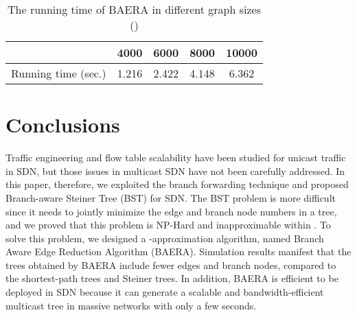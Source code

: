 \documentclass[conference]{IEEEtran}
\begin{document}
\begin{table}[t]
\caption{The running time of BAERA in different graph sizes ()}\centering
\label{table:time_v}
\begin{tabular}{|c|c|c|c|c|}
\hline
 & 4000 & 6000 & 8000 & 10000 \\ \hline
Running time (sec.) & 1.216 & 2.422 & 4.148 & 6.362 \\ \hline
\end{tabular}\end{table}

\section{Conclusions}
Traffic engineering and flow table scalability have been studied for unicast
traffic in SDN, but those issues in multicast SDN have not been carefully
addressed. In this paper, therefore, we exploited the branch forwarding
technique and proposed Branch-aware Steiner Tree (BST) for SDN. The BST
problem is more difficult since it needs to jointly minimize the edge and
branch node numbers in a tree, and we proved that this problem is NP-Hard
and inapproximable within . To solve this problem, we designed a -approximation algorithm, named Branch Aware Edge Reduction Algorithm
(BAERA). Simulation results manifest that the trees obtained by BAERA
include fewer edges and branch nodes, compared to the shortest-path trees
and Steiner trees. In addition, BAERA is efficient to be deployed in SDN because it can
generate a scalable and bandwidth-efficient multicast tree in massive
networks with only a few seconds.

\linespread{0.98}


\end{document}

